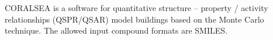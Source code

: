 CORALSEA is a software for quantitative structure – property / activity relationships (QSPR/QSAR) model buildings based on the Monte Carlo technique. The allowed input compound formats are SMILES.